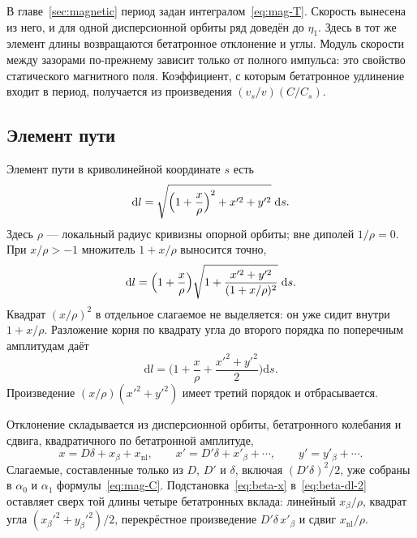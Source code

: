\documentclass[aps,pra,preprint,a4paper,amsmath,amssymb,longbibliography]{revtex4-2}
\begin{document}
В главе~\ref{sec:magnetic} период задан интегралом~\eqref{eq:mag-T}. Скорость вынесена из него, и для одной дисперсионной орбиты ряд доведён до $\eta_1$. Здесь в тот же элемент длины возвращаются бетатронное отклонение и углы. Модуль скорости между зазорами по-прежнему зависит только от полного импульса: это свойство статического магнитного поля. Коэффициент, с которым бетатронное удлинение входит в период, получается из произведения $(v_s/v)(C/C_s)$.

\subsection{Элемент пути}
\label{sec:ch2-dl}

Элемент пути в криволинейной координате $s$ есть
\begin{equation}
\label{eq:beta-dl}
\mathrm{d}l
=\sqrt{\Bigl(1+\frac{x}{\rho}\Bigr)^2+x'^2+y'^2}\;\mathrm{d}s.
\end{equation}
Здесь $\rho$ --- локальный радиус кривизны опорной орбиты; вне диполей $1/\rho=0$. При $x/\rho>-1$ множитель $1+x/\rho$ выносится точно,
\begin{equation}
\label{eq:beta-dl-factor}
\mathrm{d}l
=\Bigl(1+\frac{x}{\rho}\Bigr)
\sqrt{1+\frac{x'^2+y'^2}{(1+x/\rho)^2}}\;\mathrm{d}s.
\end{equation}
Квадрат $(x/\rho)^2$ в отдельное слагаемое не выделяется: он уже сидит внутри $1+x/\rho$. Разложение корня по квадрату угла до второго порядка по поперечным амплитудам даёт
\begin{equation}
\label{eq:beta-dl-2}
\mathrm{d}l
=\Biggl(1+\frac{x}{\rho}+\frac{x'^2+y'^2}{2}\Biggr)\mathrm{d}s.
\end{equation}
Произведение $(x/\rho)(x'^2+y'^2)$ имеет третий порядок и отбрасывается.

Отклонение складывается из дисперсионной орбиты, бетатронного колебания и сдвига, квадратичного по бетатронной амплитуде,
\begin{equation}
\label{eq:beta-x}
x=D\delta+x_\beta+x_{\mathrm{nl}},
\qquad
x'=D'\delta+x'_\beta+\cdots,
\qquad
y'=y'_\beta+\cdots.
\end{equation}
Слагаемые, составленные только из $D$, $D'$ и $\delta$, включая $(D'\delta)^2/2$, уже собраны в $\alpha_0$ и $\alpha_1$ формулы~\eqref{eq:mag-C}. Подстановка~\eqref{eq:beta-x} в~\eqref{eq:beta-dl-2} оставляет сверх той длины четыре бетатронных вклада: линейный $x_\beta/\rho$, квадрат угла $(x_\beta'^2+y_\beta'^2)/2$, перекрёстное произведение $D'\delta\,x'_\beta$ и сдвиг $x_{\mathrm{nl}}/\rho$.
\end{document}
